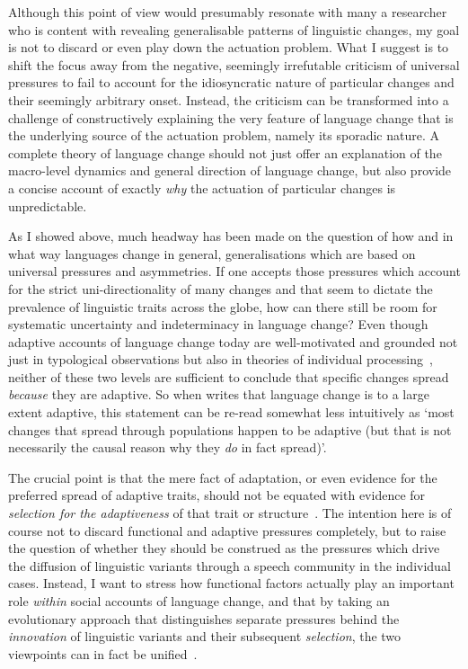 Although this point of view would presumably resonate with many a researcher who is content with revealing generalisable patterns of linguistic changes, my goal is not to discard or even play down the actuation problem. 
What I suggest is to shift the focus away from the negative, seemingly irrefutable criticism of universal pressures to fail to account for the idiosyncratic nature of particular changes and their seemingly arbitrary onset. Instead, the criticism can be transformed into a challenge of constructively explaining the very feature of language change that is the underlying source of the actuation problem, namely its sporadic nature.
A complete theory of language change should not just offer an explanation of the macro-level dynamics and general direction of language change, but also provide a concise account of exactly \emph{why} the actuation of particular changes is unpredictable. %

As I showed above, much headway has been made on the question of how and in what way languages change in general, generalisations which are based on universal pressures and asymmetries. If one accepts those pressures which account for the strict uni-directionality of many changes and that seem to dictate the prevalence of linguistic traits across the globe, how can there still be room for systematic uncertainty and indeterminacy in language change?
Even though adaptive accounts of language change today are well-motivated and grounded not just in typological observations but also in theories of individual processing~\citep{Kirby1999,Jaeger2010}, neither of these two levels are sufficient to conclude that specific changes spread \emph{because} they are adaptive. So when \citet{Wichmann2015} writes that language change is to a large extent adaptive, this statement can be re-read somewhat less intuitively as `most changes that spread through populations happen to be adaptive (but that is not necessarily the causal reason why they \emph{do} in fact spread)'.

The crucial point is that the mere fact of adaptation, or even evidence for the preferred spread of adaptive traits, should not be equated with evidence for \emph{selection for the adaptiveness} of that trait or structure~\citep{Henrich2008}. %
The intention here is of course not to discard functional and adaptive pressures completely, but to raise the question of whether they should be construed as the pressures which drive the diffusion of linguistic variants through a speech community in the individual cases.
Instead, I want to stress how functional factors actually play an important role \emph{within} social accounts of language change, and that by taking an evolutionary approach that distinguishes separate pressures behind the \emph{innovation} of linguistic variants and their subsequent \emph{selection}, the two viewpoints can in fact be unified~\citep{Croft2000,Croft2006}.

